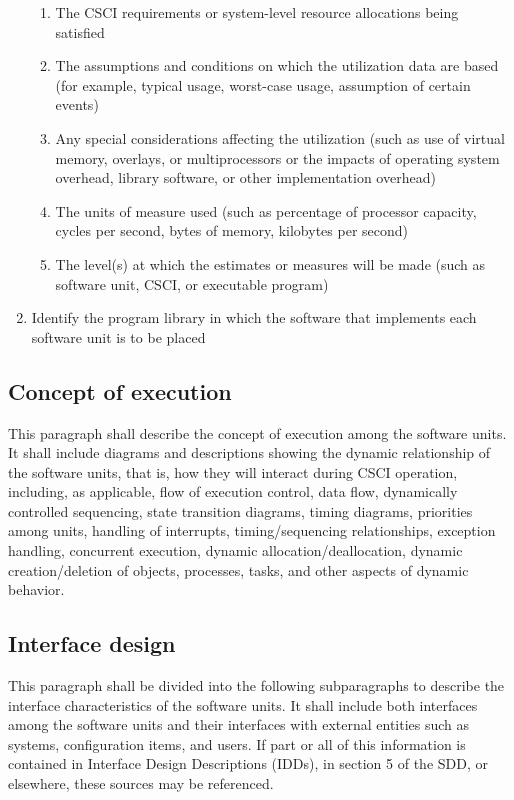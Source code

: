 \documentclass{fidata-report-template}
\begin{document}
\begin{enumerate}
  \begin{enumerate}
  \itemsep1pt\parskip0pt
  \item
    The CSCI requirements or system-level resource allocations being
    satisfied
  \item
    The assumptions and conditions on which the utilization data are
    based (for example, typical usage, worst-case usage, assumption of
    certain events)
  \item
    Any special considerations affecting the utilization (such as use of
    virtual memory, overlays, or multiprocessors or the impacts of
    operating system overhead, library software, or other implementation
    overhead)
  \item
    The units of measure used (such as percentage of processor capacity,
    cycles per second, bytes of memory, kilobytes per second)
  \item
    The level(s) at which the estimates or measures will be made (such
    as software unit, CSCI, or executable program)
  \end{enumerate}
\item
  Identify the program library in which the software that implements
  each software unit is to be placed
\end{enumerate}

\subsection{Concept of execution}

This paragraph shall describe the concept of execution among the
software units. It shall include diagrams and descriptions showing the
dynamic relationship of the software units, that is, how they will
interact during CSCI operation, including, as applicable, flow of
execution control, data flow, dynamically controlled sequencing, state
transition diagrams, timing diagrams, priorities among units, handling
of interrupts, timing/sequencing relationships, exception handling,
concurrent execution, dynamic allocation/deallocation, dynamic
creation/deletion of objects, processes, tasks, and other aspects of
dynamic behavior.

\subsection{Interface design}

This paragraph shall be divided into the following subparagraphs to
describe the interface characteristics of the software units. It shall
include both interfaces among the software units and their interfaces
with external entities such as systems, configuration items, and users.
If part or all of this information is contained in Interface Design
Descriptions (IDDs), in section 5 of the SDD, or elsewhere, these
sources may be referenced.
\end{document}

